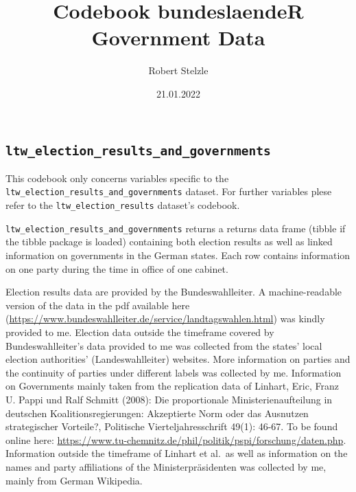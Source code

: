 \documentclass[
]{article}
\title{Codebook bundeslaendeR Government Data}
\author{Robert Stelzle}
\date{21.01.2022}
\begin{document}
\maketitle

\hypertarget{ltw_election_results_and_governments}{%
\subsection{\texorpdfstring{\texttt{ltw\_election\_results\_and\_governments}}{ltw\_election\_results\_and\_governments}}\label{ltw_election_results_and_governments}}

This codebook only concerns variables specific to the
\texttt{ltw\_election\_results\_and\_governments} dataset. For further
variables plese refer to the \texttt{ltw\_election\_results} dataset's
codebook.

\texttt{ltw\_election\_results\_and\_governments} returns a returns data
frame (tibble if the tibble package is loaded) containing both election
results as well as linked information on governments in the German
states. Each row contains information on one party during the time in
office of one cabinet.

Election results data are provided by the Bundeswahlleiter. A
machine-readable version of the data in the pdf available here
(\url{https://www.bundeswahlleiter.de/service/landtagswahlen.html}) was
kindly provided to me. Election data outside the timeframe covered by
Bundeswahlleiter's data provided to me was collected from the states'
local election authorities' (Landeswahlleiter) websites. More
information on parties and the continuity of parties under different
labels was collected by me. Information on Governments mainly taken from
the replication data of Linhart, Eric, Franz U. Pappi und Ralf Schmitt
(2008): Die proportionale Ministerienaufteilung in deutschen
Koalitionsregierungen: Akzeptierte Norm oder das Ausnutzen strategischer
Vorteile?, Politische Vierteljahresschrift 49(1): 46-67. To be found
online here:
\url{https://www.tu-chemnitz.de/phil/politik/pspi/forschung/daten.php}.
Information outside the timeframe of Linhart et al.~as well as
information on the names and party affiliations of the
Ministerpräsidenten was collected by me, mainly from German Wikipedia.
\end{document}
